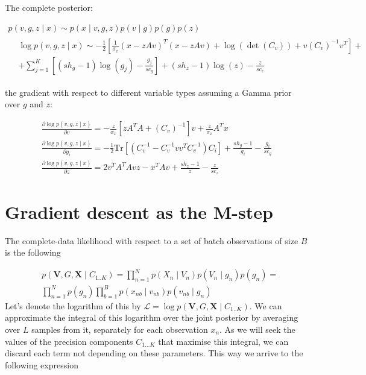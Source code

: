 \documentclass{paper}
\begin{document}
The complete posterior:

\begin{eqnarray}
p(v,g,z \mid x) \sim p(x \mid v,g,z) p(v \mid g) p(g) p(z) \\
\begin{split}
& \log p(v,g,z \mid x) \sim -\frac{1}{2} \left[ \frac{1}{\sigma_x} (x - zAv)^T (x - zAv) + \log \left( \det \left( C_v \right) \right) + v \left(C_v \right)^{-1} v^T \right] + \\
& + \sum_{j=1}^K \left[ (sh_g - 1) \log(g_j) - \frac{g_j}{sc_g} \right] + (sh_z - 1) \log(z) - \frac{z}{sc_z}
\end{split}
\end{eqnarray}

the gradient with respect to different variable types assuming a Gamma prior over $g$ and $z$:

\begin{eqnarray}
\frac{\partial \log p(v,g,z \mid x)}{\partial v} = - \frac{z}{\sigma_x} \left[ zA^TA + \left( C_v \right)^{-1} \right] v + \frac{z}{\sigma_x} A^T x \\
\frac{\partial \log p(v,g,z \mid x)}{\partial g_i} = -\frac{1}{2} \textrm{Tr} \left[ \left( C_v^{-1} - C_v^{-1} v v^T C_v^{-1} \right) C_i \right] + \frac{sh_g - 1}{g_i} - \frac{g_i}{sc_g} \\
\frac{\partial \log p(v,g,z \mid x)}{\partial z} = 2v^TA^TAvz -x^TAv + \frac{sh_z - 1}{z} - \frac{z}{sc_z}
\end{eqnarray}


\section{Gradient descent as the M-step}

The complete-data likelihood with respect to a set of batch observations of size $B$ is the following

\begin{equation}
\begin{split}
&p(\mathbf{V},G,\mathbf{X} \mid C_{1..K}) = \prod_{n=1}^N p(X_n \mid V_n) p(V_n \mid g_n) p(g_n) = \\
&\prod_{n=1}^N p(g_n) \prod_{b=1}^B p(x_{nb} \mid v_{nb}) p(v_{nb} \mid g_n) 
\end{split}
\end{equation}
%
Let's denote the logarithm of this by $\mathcal{L}=\log p(\mathbf{V},G,\mathbf{X} \mid C_{1..K})$. We can approximate the integral of this logarithm over the joint posterior by averaging over $L$ samples from it, separately for each observation $x_n$. As we will seek the values of the precision components $C_{1 \dots K}$ that maximise this integral, we can discard each term not depending on these parameters. This way we arrive to the following expression 
\end{document}
